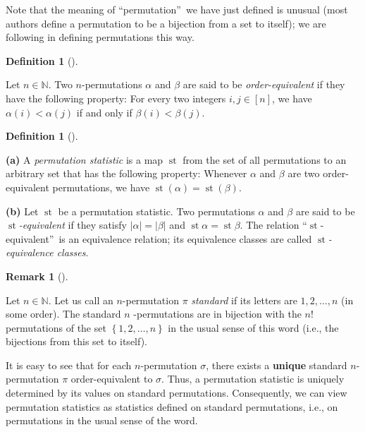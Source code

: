 \documentclass[numbers=enddot,12pt,final,onecolumn,notitlepage]{scrartcl}%
\theoremstyle{definition}
\newtheorem{defi}[theo]{Definition}
\newenvironment{definition}[1][]
{\begin{defi}[#1]\begin{leftbar}}
{\end{leftbar}\end{defi}}
\newtheorem{remk}[theo]{Remark}
\newenvironment{remark}[1][]
{\begin{remk}[#1]\begin{leftbar}}
{\end{leftbar}\end{remk}}
\begin{document}
Note that the meaning of \textquotedblleft permutation\textquotedblright\ we
have just defined is unusual (most authors define a permutation to be a
bijection from a set to itself); we are following \cite{part1} in defining
permutations this way.

\begin{definition}
Let $n\in\mathbb{N}$. Two $n$-permutations $\alpha$ and $\beta$ are said to be
\textit{order-equivalent} if they have the following property: For every two
integers $i,j\in\left[  n\right]  $, we have $\alpha\left(  i\right)
<\alpha\left(  j\right)  $ if and only if $\beta\left(  i\right)
<\beta\left(  j\right)  $.
\end{definition}

\begin{definition}
\textbf{(a)} A \textit{permutation statistic} is a map $\operatorname*{st}$
from the set of all permutations to an arbitrary set that has the following
property: Whenever $\alpha$ and $\beta$ are two order-equivalent permutations,
we have $\operatorname*{st}\left(  \alpha\right)  =\operatorname*{st}\left(
\beta\right)  $.

\textbf{(b)} Let $\operatorname*{st}$ be a permutation statistic. Two
permutations $\alpha$ and $\beta$ are said to be $\operatorname*{st}%
$\textit{-equivalent} if they satisfy $\left\vert \alpha\right\vert
=\left\vert \beta\right\vert $ and $\operatorname*{st}\alpha
=\operatorname*{st}\beta$. The relation \textquotedblleft$\operatorname*{st}%
$-equivalent\textquotedblright\ is an equivalence relation; its equivalence
classes are called $\operatorname*{st}$\textit{-equivalence classes}.
\end{definition}

\begin{remark}
Let $n\in\mathbb{N}$. Let us call an $n$-permutation $\pi$ \textit{standard}
if its letters are $1,2,\ldots,n$ (in some order). The standard $n$%
-permutations are in bijection with the $n!$ permutations of the set $\left\{
1,2,\ldots,n\right\}  $ in the usual sense of this word (i.e., the bijections
from this set to itself).

It is easy to see that for each $n$-permutation $\sigma$, there exists a
\textbf{unique} standard $n$-permutation $\pi$ order-equivalent to $\sigma$.
Thus, a permutation statistic is uniquely determined by its values on standard
permutations. Consequently, we can view permutation statistics as statistics
defined on standard permutations, i.e., on permutations in the usual sense of
the word.
\end{remark}
\end{document}
